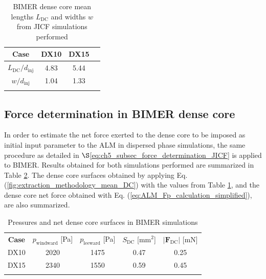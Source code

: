 
\begin{table}[!h]
\centering
\caption{BIMER dense core mean lengths $L_\mathrm{DC}$ and widths $w$ from JICF simulations performed}
\begin{tabular}{cccc}
\thickhline
\textbf{Case} &   DX10 & DX15  \\
\hline
$L_\mathrm{DC}/d_\mathrm{inj}$ & 4.83 & 5.44  \\
$w/d_\mathrm{inj}$ & 1.04 & 1.33  \\
\thickhline
\end{tabular}
\label{tab:BIMER_L_DC_values}
\end{table}


\subsection{Force determination in BIMER dense core}

In order to estimate the net force exerted to the dense core to be imposed as initial input parameter to the ALM in dispersed phase simulations, the same procedure as detailed in $\S$\ref{eq:ch5_subsec_force_determination_JICF} is applied to BIMER. Results obtained for both simulations performed are summarized in Table \ref{tab:BIMER_dense_core_pressures_and_force_parameters}. The dense core surfaces obtained by applying Eq. (\ref{fig:extraction_methodology_mean_DC}) with the values from Table \ref{tab:BIMER_L_DC_values}, and the dense core net force obtained with Eq. (\ref{eq:ALM_Fp_calculation_simplified}), are also summarized.


\begin{table}[!h]
\centering
\caption{Pressures and net dense core surfaces in BIMER simulations}
\begin{tabular}{ccccc}
\thickhline
\textbf{Case} & $p_\mathrm{windward}$ [Pa] & $p_\mathrm{leeward}$ [Pa] & $S_\mathrm{DC}$ [mm$^2$]& $|\boldsymbol{F}_\mathrm{DC}|$ [mN] \\
\thickhline 
DX10 & 2020 & 1475 & 0.47 & 0.25 \\
DX15 & 2340 & 1550 & 0.59 & 0.45 \\
\thickhline
\end{tabular}
\label{tab:BIMER_dense_core_pressures_and_force_parameters}
\end{table}

